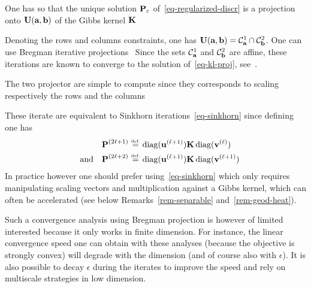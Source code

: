 One has 
so that the unique solution $\P_\epsilon$ of~\eqref{eq-regularized-discr} is a projection onto $\CouplingsD(\a,\b)$ of the Gibbs kernel $\K$

Denoting 
the rows and columns constraints, one has $\CouplingsD(\a,\b) = \Cc^1_\a \cap \Cc^2_\b$. One can use Bregman iterative projections~\cite{bregman1967relaxation}
Since the sets $\Cc^1_\a$ and $\Cc^2_\b$ are affine, these iterations are known to converge to the solution of~\eqref{eq-kl-proj}, see~\cite{bregman1967relaxation}. 

The two projector are simple to compute since they corresponds to scaling respectively the rows and the columns

These iterate are equivalent to Sinkhorn iterations~\eqref{eq-sinkhorn} since defining 
\eq{\label{eq-sink-matrix}\P^{(2\ell)} \eqdef \diag(\it{\uD}) \K \diag(\it{\vD}),}
one has
\begin{align*}
	\P^{(2\ell+1)} &\eqdef \diag(\itt{\uD}) \K \diag(\it{\vD}) \\
	\qandq
	\P^{(2\ell+2)} &\eqdef \diag(\itt{\uD}) \K \diag(\itt{\vD})
\end{align*}
In practice however one should prefer using~\eqref{eq-sinkhorn} which only requires manipulating scaling vectors and multiplication against a Gibbs kernel, which can often be accelerated (see below Remarks~\ref{rem-separable} and~\ref{rem-geod-heat}). 

Such a convergence analysis using Bregman projection is however of limited interested because it only works in finite dimension. For instance, the linear convergence speed one can obtain with these analyses (because the objective is strongly convex) will degrade with the dimension (and of course also with $\epsilon$). 
%
It is also possible to decay $\epsilon$ during the iterates to improve the speed and rely on multiscale strategies in low dimension.
 
